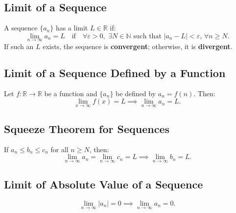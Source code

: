 \documentclass[a4paper,11pt]{article}
\begin{document}


\subsection{Limit of a Sequence}

\begin{tcolorbox}
    A sequence $\{a_n\}$ has a limit $L \in \mathbb{R}$ if:
    \[
    \lim_{n \to \infty} a_n = L \quad \text{if} \quad \forall \varepsilon>0, \, \, \exists N \in \mathbb{N} \text{ such that } |a_n - L| < \varepsilon, \, \forall n \geq N.
    \]
    If such an $L$ exists, the sequence is \textbf{convergent}; otherwise, it is \textbf{divergent}.
\end{tcolorbox}




\subsection{Limit of a Sequence Defined by a Function}

\begin{tcolorbox}
    Let $f: \mathbb{R} \to \mathbb{R}$ be a function and $\{a_n\}$ be defined by $a_n = f(n)$. Then:
    \[
    \lim_{x \to \infty} f(x) = L \implies \lim_{n \to \infty} a_n = L.
    \]
\end{tcolorbox}




\subsection{Squeeze Theorem for Sequences}

\begin{tcolorbox}
    If $a_n \leq b_n \leq c_n$ for all $n \geq N$, then:
    \[
    \lim_{n \to \infty} a_n = \lim_{n \to \infty} c_n = L \implies \lim_{n \to \infty} b_n = L.
    \]
\end{tcolorbox}




\subsection{Limit of Absolute Value of a Sequence}

\begin{tcolorbox}
    \[
    \lim_{n \to \infty} | a_n | = 0 \implies \lim_{n \to \infty} a_n = 0.
    \]
\end{tcolorbox}
\end{document}
